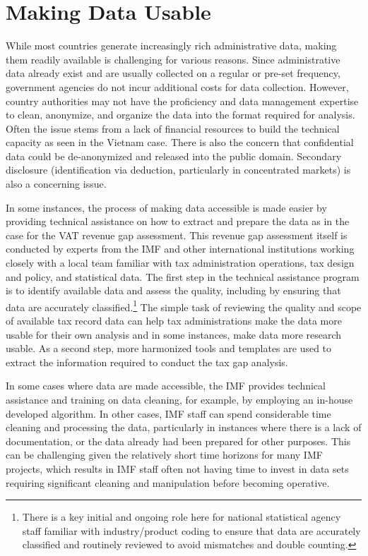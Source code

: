 \hypertarget{making-data-usable}{%
\section{Making Data Usable}\label{making-data-usable}}

While most countries generate increasingly rich administrative data, making them readily available is challenging for various reasons. Since administrative data already exist and are usually collected on a regular or pre-set frequency, government agencies do not incur additional costs for data collection. However, country authorities may not have the proficiency and data management expertise to clean, anonymize, and organize the data into the format required for analysis. Often the issue stems from a lack of financial resources to build the technical capacity as seen in the Vietnam case. There is also the concern that confidential data could be de-anonymized and released into the public domain. Secondary disclosure (identification via deduction, particularly in concentrated markets) is also a concerning issue.

In some instances, the process of making data accessible is made easier by providing technical assistance on how to extract and prepare the data as in the case for the VAT revenue gap assessment. This revenue gap assessment itself is conducted by experts from the IMF and other international institutions working closely with a local team familiar with tax administration operations, tax design and policy, and statistical data. The first step in the technical assistance program is to identify available data and assess the quality, including by ensuring that data are accurately classified.\footnote{There is a key initial and ongoing role here for national statistical agency staff familiar with industry/product coding to ensure that data are accurately classified and routinely reviewed to avoid mismatches and double counting.} The simple task of reviewing the quality and scope of available tax record data can help tax administrations make the data more usable for their own analysis and in some instances, make data more research usable. As a second step, more harmonized tools and templates are used to extract the information required to conduct the tax gap analysis.

In some cases where data are made accessible, the IMF provides technical assistance and training on data cleaning, for example, by employing an in-house developed algorithm. In other cases, IMF staff can spend considerable time cleaning and processing the data, particularly in instances where there is a lack of documentation, or the data already had been prepared for other purposes. This can be challenging given the relatively short time horizons for many IMF projects, which results in IMF staff often not having time to invest in data sets requiring significant cleaning and manipulation before becoming operative.

